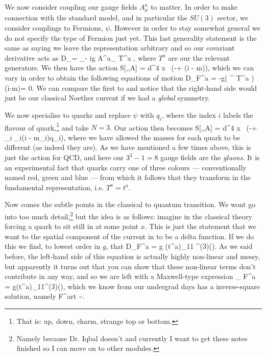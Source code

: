 We now consider coupling our gauge fields $A_{\mu}^a$ to matter. In order to make connection with the standard model, and in particular the $SU(3)$ sector, we consider couplings to Fermions, $\psi$. However in order to stay somewhat general we do not specify the type of Fermion just yet. This last generality statement is the same as saying we leave the representation arbitrary and so our covariant derivative acts as 
\bse 
    D_{\mu}\psi = \p_{\mu}\psi - ig A^a_{\mu} T^a \psi,
\ese
where $T^a$ are our the relevant generators. We then have the action 
\bse 
    S[\psi,\overline{\psi},A] = \int d^4 x \, \bigg(-\tr[F_{\mu\nu}F^{\mu\nu}] + \overline{\psi}\big(i - m\big)\psi\bigg),
\ese 
which we can vary in order to obtain the following equations of motion 
\be 
\label{eqn:YangMillsWithField}
    D_{\mu}F^{a\mu\nu} = -g\big(\overline{\psi} \g^{\nu} T^a \psi\big) \qand \big(i-m)\psi = 0.
\ee 
We can compare the first to  and notice that the right-hand side would just be our classical Noether current if we had a \textit{global} symmetry.

We now specialise to quarks and replace $\psi$ with $q_i$, where the index $i$ labels the flavour of quark,\footnote{That is: up, down, charm, strange top or bottom.} and take $N=3$. Our action then becomes 
\bse 
    S[\psi,\overline{\psi},A] = \int d^4 x \, \bigg(-\tr[F_{\mu\nu}F^{\mu\nu}] + \sum_i _i\big(i - m_i\big)q_i\bigg),
\ese 
where we have allowed the masses for each quark to be different (as indeed they are). As we have mentioned a few times above, this is just the action for QCD, and here our $3^3-1=8$ gauge fields are the \textit{gluons}. It is an experimental fact that quarks carry one of three colours --- conventionally named red, green and blue --- from which it follows that they transform in the fundamental representation, i.e. $T^a=t^a$. 

Now comes the subtle points in the classical to quantum transition. We wont go into too much detail,\footnote{Namely because Dr. Iqbal doesn't and currently I want to get these notes finished so I can move on to other modules.} but the idea is as follows: imagine in the classical theory forcing a quark to sit still in at some point $x$. This is just the statement that we want to the spatial component of the current in  to be a delta function. If we do this we find, to lowest order in $g$, that 
\bse 
    D_{\mu}F^{a\mu\nu} = g (t^a)_{11} \del^{(3)}().
\ese
As we said before, the left-hand side of this equation is actually highly non-linear and messy, but apparently it turns out that you can show that these non-linear terms don't contribute in any way, and so we are left with a Maxwell-type expression 
\bse 
    \p_{\mu} F^{a\mu\nu} = g(t^a)_{11}\del^{(3)}(),
\ese 
which we know from our undergrad days has a inverse-square solution, namely
\bse 
    F^{art} \sim {}.
\ese

